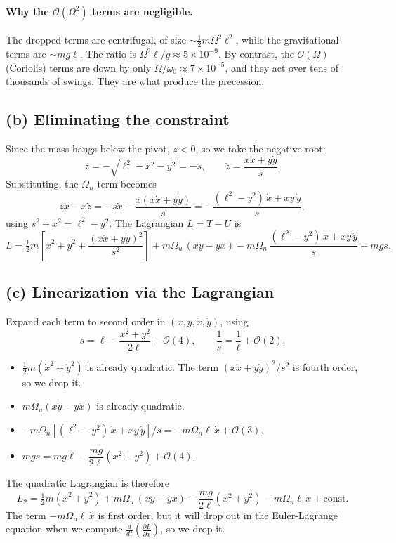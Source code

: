 \documentclass[11pt,letterpaper]{article}
\newcommand{\Ou}{\Omega_u}
\newcommand{\On}{\Omega_n}
\begin{document}
\paragraph{Why the $\mathcal{O}(\Omega^2)$ terms are negligible.} The dropped terms are centrifugal, of size $\sim\tfrac12 m\Omega^2\ell^2$, while the gravitational terms are $\sim mg\ell$. The ratio is $\Omega^2\ell/g \approx 5\times10^{-9}$. By contrast, the $\mathcal{O}(\Omega)$ (Coriolis) terms are down by only $\Omega/\omega_0 \approx 7\times10^{-5}$, and they act over tens of thousands of swings. They are what produce the precession.

\subsection*{(b) Eliminating the constraint}

Since the mass hangs below the pivot, $z < 0$, so we take the negative root:
\[
z = -\sqrt{\ell^2 - x^2 - y^2} = -s, \qquad
\dot z = \frac{x\dot x + y\dot y}{s}.
\]
Substituting, the $\On$ term becomes
\[
z\dot x - x\dot z = -s\dot x - \frac{x(x\dot x + y\dot y)}{s}
= -\frac{(\ell^2 - y^2)\,\dot x + x y\,\dot y}{s},
\]
using $s^2 + x^2 = \ell^2 - y^2$. The Lagrangian $L = T - U$ is
\[
\boxed{L = \tfrac12 m\left[\dot x^2 + \dot y^2 + \frac{(x\dot x + y\dot y)^2}{s^2}\right]
+ m\Ou\,(x\dot y - y\dot x)
- m\On\,\frac{(\ell^2 - y^2)\,\dot x + x y\,\dot y}{s}
+ m g s .}
\]

\subsection*{(c) Linearization via the Lagrangian}

Expand each term to second order in $(x, y, \dot x, \dot y)$, using
\[
s = \ell - \frac{x^2 + y^2}{2\ell} + \mathcal{O}(4), \qquad \frac1s = \frac1\ell + \mathcal{O}(2).
\]
\begin{itemize}
    \item $\tfrac12 m(\dot x^2 + \dot y^2)$ is already quadratic. The term $(x\dot x + y\dot y)^2/s^2$ is fourth order, so we drop it.
    \item $m\Ou(x\dot y - y\dot x)$ is already quadratic.
    \item $-m\On\left[(\ell^2 - y^2)\,\dot x + xy\,\dot y\right]/s = -m\On\ell\,\dot x + \mathcal{O}(3)$.
    \item $mgs = mg\ell - \dfrac{mg}{2\ell}(x^2 + y^2) + \mathcal{O}(4)$.
\end{itemize}
The quadratic Lagrangian is therefore
\[
L_2 = \tfrac12 m(\dot x^2 + \dot y^2) + m\Ou\,(x\dot y - y\dot x) - \frac{mg}{2\ell}(x^2 + y^2) - m\On\ell\,\dot x + \text{const}.
\]
The term $-m\On\ell\,\dot x$ is first order, but it will drop out in the Euler-Lagrange equation when we compute $\frac{d}{dt}\left(\frac{\partial L}{\partial \dot{x}}\right)$, so we drop it.
\end{document}
